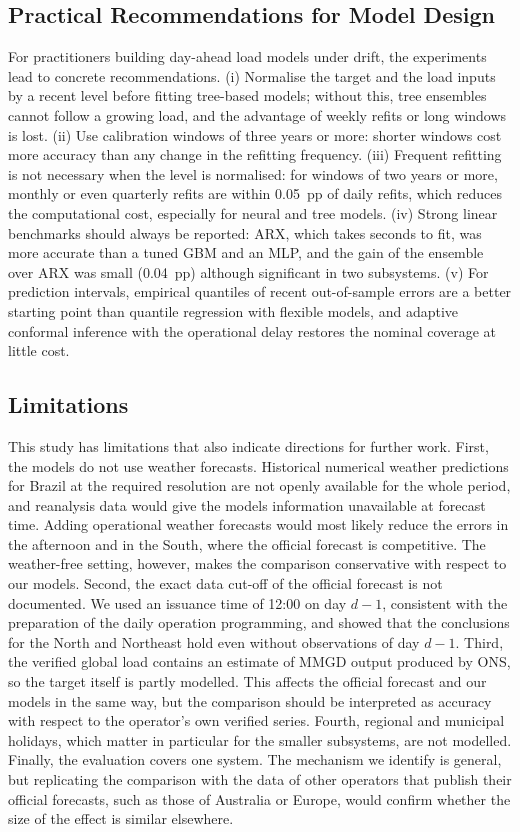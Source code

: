 \subsection{Practical Recommendations for Model Design}
For practitioners building day-ahead load models under drift, the experiments lead to concrete recommendations. (i) Normalise the target and the load inputs by a recent level before fitting tree-based models; without this, tree ensembles cannot follow a growing load, and the advantage of weekly refits or long windows is lost. (ii) Use calibration windows of three years or more: shorter windows cost more accuracy than any change in the refitting frequency. (iii) Frequent refitting is not necessary when the level is normalised: for windows of two years or more, monthly or even quarterly refits are within 0.05~pp of daily refits, which reduces the computational cost, especially for neural and tree models. (iv) Strong linear benchmarks should always be reported: ARX, which takes seconds to fit, was more accurate than a tuned GBM and an MLP, and the gain of the ensemble over ARX was small (0.04~pp) although significant in two subsystems. (v) For prediction intervals, empirical quantiles of recent out-of-sample errors are a better starting point than quantile regression with flexible models, and adaptive conformal inference with the operational delay restores the nominal coverage at little cost.

\subsection{Limitations}
This study has limitations that also indicate directions for further work. First, the models do not use weather forecasts. Historical numerical weather predictions for Brazil at the required resolution are not openly available for the whole period, and reanalysis data would give the models information unavailable at forecast time. Adding operational weather forecasts would most likely reduce the errors in the afternoon and in the South, where the official forecast is competitive. The weather-free setting, however, makes the comparison conservative with respect to our models. Second, the exact data cut-off of the official forecast is not documented. We used an issuance time of 12:00 on day $d-1$, consistent with the preparation of the daily operation programming, and showed that the conclusions for the North and Northeast hold even without observations of day $d-1$. Third, the verified global load contains an estimate of MMGD output produced by ONS, so the target itself is partly modelled. This affects the official forecast and our models in the same way, but the comparison should be interpreted as accuracy with respect to the operator's own verified series. Fourth, regional and municipal holidays, which matter in particular for the smaller subsystems, are not modelled. Finally, the evaluation covers one system. The mechanism we identify is general, but replicating the comparison with the data of other operators that publish their official forecasts, such as those of Australia or Europe, would confirm whether the size of the effect is similar elsewhere.
